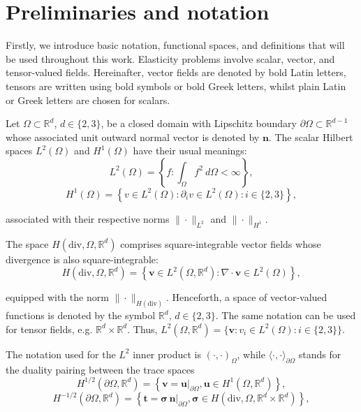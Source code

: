 \documentclass[english,11pt,3p,number,sort&compress]{elsarticle}
\begin{document}
\section{Preliminaries and notation} \label{sec:notations}

Firstly, we introduce basic notation, functional spaces, and definitions that will be used throughout this work. Elasticity problems involve scalar, vector, and tensor-valued fields. Hereinafter, vector fields are denoted by bold Latin letters, tensors are written using bold symbols or bold Greek letters, whilst plain Latin or Greek letters are chosen for scalars.

Let $\Omega \subset \mathbb{R}^d$, $d \in \{2, 3\}$, be a closed domain with Lipschitz boundary $\partial \Omega \subset \mathbb{R}^{d-1}$ whose  associated unit outward normal vector is denoted by $\bm{n}$. The scalar Hilbert spaces $L^2(\Omega)$ and $H^1(\Omega)$ have their usual meanings:
\begin{equation*}
    L^2(\Omega) = \left\{f: \int_{\Omega} f^2  ~d \Omega < \infty \right\},
\end{equation*}
\begin{equation*}
    H^1(\Omega) = \left\{v \in L^2(\Omega) : \partial_i v \in L^2 
    (\Omega) : i \in\{2,3\} \right\},
\end{equation*}

\noindent associated with their respective norms $\| \cdot \|_{L^2}$ and $\| \cdot \|_{H^1}$.

The space $H(\text{div},\Omega,\mathbb{R}^d)$ comprises square-integrable vector fields whose divergence is also square-integrable:
\begin{equation*}
	H(\text{div},\Omega,\mathbb{R}^d) = \left\{\bm{v} \in L^2(\Omega,\mathbb{R}^d) : \nabla \cdot \bm{v} \in L^2(\Omega) \right\},
\end{equation*}

\noindent equipped with the norm $\| \cdot \|_{H(\text{div})}$. Henceforth, a space of vector-valued functions is denoted by the symbol $\mathbb{R}^d, \,d \in \{2,3\}$. The same notation can be used for tensor fields, e.g. $\mathbb{R}^d \times \mathbb{R}^d$. Thus, \(L^2(\Omega,\mathbb{R}^d)=\{\bm{v} : v_i \in L^2(\Omega) : i \in\{2,3\} \}\).

The notation used for the $L^2$ inner product is $(\cdot,\cdot)_{\Omega}$, while $\langle \cdot,\cdot\rangle_{\partial\Omega}$ stands for the duality pairing between the trace spaces
\begin{equation*}
	H^{1/2}(\partial\Omega,\mathbb{R}^d) = \left\{\bm{v}=\bm{u} \lvert_{\partial\Omega}, \bm{u} \in H^1(\Omega,\mathbb{R}^d)\right\},
\end{equation*}
\begin{equation*}
	H^{-1/2}(\partial\Omega,\mathbb{R}^d) = \left\{\bm{t}=\bm{\sigma} \,\bm{n} \lvert_{\partial\Omega}, \bm{\sigma} \in H(\text{div},\Omega,\mathbb{R}^d \times \mathbb{R}^d) \right\},
\end{equation*}
\end{document}
